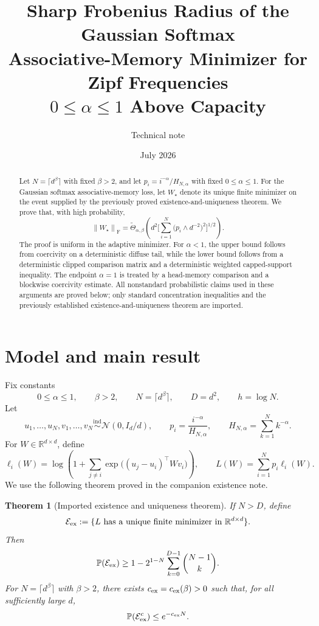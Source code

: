 \documentclass[11pt]{article}
\title{Sharp Frobenius Radius of the Gaussian Softmax\\
Associative-Memory Minimizer for Zipf Frequencies\\
$0\leq \alpha\leq 1$ Above Capacity}
\author{Technical note}
\date{July 2026}
\newtheorem{theorem}{Theorem}[section]
\theoremstyle{remark}
\newcommand{\R}{\mathbb R}
\newcommand{\Pp}{\mathbb P}
\newcommand{\norm}[1]{\left\lVert #1\right\rVert}
\newcommand{\F}{\mathrm{F}}
\newcommand{\1}{\mathbf 1}
\begin{document}
\maketitle

\begin{abstract}
Let $N=\lceil d^\beta\rceil$ with fixed $\beta>2$, and let
$p_i=i^{-\alpha}/H_{N,\alpha}$ with fixed $0\leq\alpha\leq1$.
For the Gaussian softmax associative-memory loss, let $W_\star$ denote
its unique finite minimizer on the event supplied by the previously
proved existence-and-uniqueness theorem.  We prove that, with high
probability,
\[
 \norm{W_\star}_{\F}
 =\widetilde\Theta_{\alpha,\beta}\!\left(
 d^2\Bigg[\sum_{i=1}^N\bigl(p_i\wedge d^{-2}\bigr)^2\Bigg]^{1/2}
 \right).
\]
The proof is uniform in the adaptive minimizer.  For $\alpha<1$, the
upper bound follows from coercivity on a deterministic diffuse tail,
while the lower bound follows from a deterministic clipped comparison
matrix and a deterministic weighted capped-support inequality.  The
endpoint $\alpha=1$ is treated by a head-memory comparison and a
blockwise coercivity estimate.  All nonstandard probabilistic claims
used in these arguments are proved below; only standard concentration
inequalities and the previously established existence-and-uniqueness
theorem are imported.
\end{abstract}

\section{Model and main result}

Fix constants
\[
 0\leq\alpha\leq1,
 \qquad \beta>2,
 \qquad N=\lceil d^\beta\rceil,
 \qquad D=d^2,
 \qquad h=\log N.
\]
Let
\[
 u_1,\ldots,u_N,v_1,\ldots,v_N
 \overset{\mathrm{ind}}{\sim}\mathcal N(0,I_d/d),
 \qquad
 p_i=\frac{i^{-\alpha}}{H_{N,\alpha}},
 \qquad
 H_{N,\alpha}=\sum_{k=1}^N k^{-\alpha}.
\]
For $W\in\R^{d\times d}$, define
\[
 \ell_i(W)
 =\log\!\left(1+\sum_{j\neq i}
 \exp\bigl((u_j-u_i)^\top Wv_i\bigr)\right),
 \qquad
 L(W)=\sum_{i=1}^N p_i\ell_i(W).
\]
We use the following theorem proved in the companion existence note.

\begin{theorem}[Imported existence and uniqueness theorem]
\label{thm:existence}
If $N>D$, define
\[
 \mathcal E_{\rm ex}
 :=\{L\text{ has a unique finite minimizer in }\R^{d\times d}\}.
\]
Then
\[
 \Pp(\mathcal E_{\rm ex})
 \geq
 1-2^{1-N}\sum_{k=0}^{D-1}\binom{N-1}{k}.
\]
For $N=\lceil d^\beta\rceil$ with $\beta>2$, there exists
$c_{\rm ex}=c_{\rm ex}(\beta)>0$ such that, for all sufficiently large
$d$,
\[
 \Pp(\mathcal E_{\rm ex}^c)\leq e^{-c_{\rm ex}N}.
\]
\end{theorem}
\end{document}
